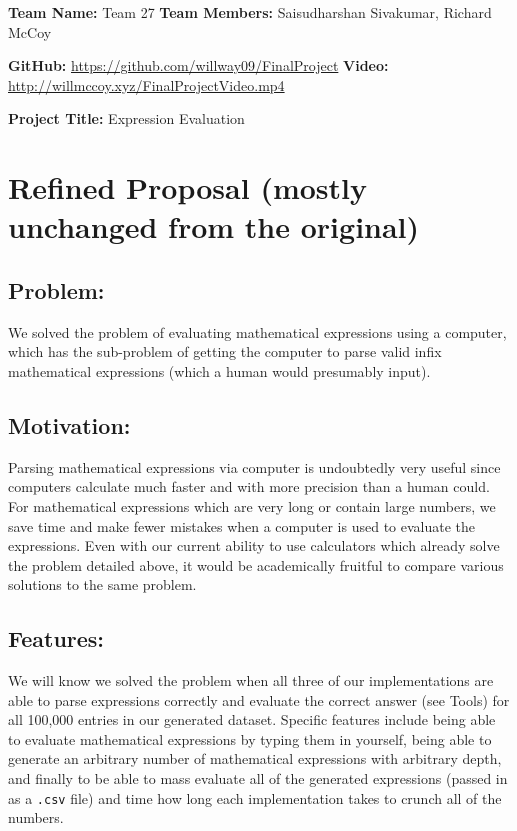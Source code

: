 \documentclass[11pt]{article}
\begin{document}
\textbf{Team Name:} Team 27 \hspace*{1cm} \textbf{Team Members:} Saisudharshan Sivakumar, Richard McCoy

\textbf{GitHub:} \href{https://github.com/willway09/FinalProject}{https://github.com/willway09/FinalProject} \textbf{Video:} \href{http://willmccoy.xyz/FinalProjectVideo.mp4}{http://willmccoy.xyz/FinalProjectVideo.mp4}

\textbf{Project Title:} Expression Evaluation

\noindent\makebox[\linewidth]{\rule{19.1cm}{0.4pt}}

\section*{Refined Proposal \small{(mostly unchanged from the original)}}

\subsection*{Problem:}
We solved the problem of evaluating mathematical expressions using a computer, which has the sub-problem of getting the computer to parse valid infix mathematical expressions (which a human would presumably input).

\subsection*{Motivation:}
Parsing mathematical expressions via computer is undoubtedly very useful since computers calculate much faster and with more precision than a human could.
For mathematical expressions which are very long or contain large numbers, we save time and make fewer mistakes when a computer is used to evaluate the expressions.
Even with our current ability to use calculators which already solve the problem detailed above, it would be academically fruitful to compare various solutions to the same problem.

\subsection*{Features:}
We will know we solved the problem when all three of our implementations are able to parse expressions correctly and evaluate the correct answer (see Tools) for all 100,000 entries in our generated dataset.
Specific features include being able to evaluate mathematical expressions by typing them in yourself, being able to generate an arbitrary number of mathematical expressions with arbitrary depth, and finally to be able to mass evaluate all of the generated expressions (passed in as a \texttt{.csv} file) and time how long each implementation takes to crunch all of the numbers.
\end{document}
